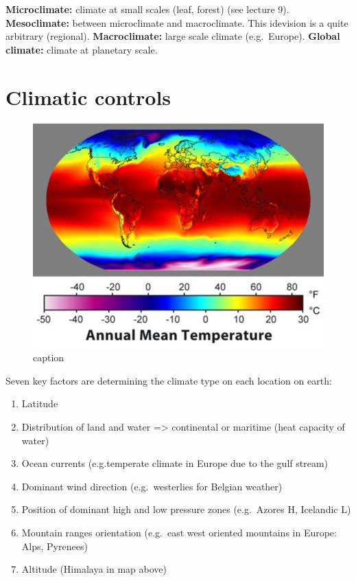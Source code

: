 \documentclass[12pt,oneside]{book}
\providecommand{\tightlist}{%
  \setlength{\itemsep}{0pt}\setlength{\parskip}{0pt}}
\begin{document}
\textbf{Microclimate:} climate at small scales (leaf, forest) (see
lecture 9). \textbf{Mesoclimate:} between microclimate and macroclimate.
This idevision is a quite arbitrary (regional). \textbf{Macroclimate:}
large scale climate (e.g.~Europe). \textbf{Global climate:} climate at
planetary scale.

\section{Climatic controls}\label{climatic-controls}

\begin{figure}

{\centering \includegraphics[width=0.8\linewidth]{figures/Figure81} 

}

\caption{caption}\label{fig:Climaticcontrols}
\end{figure}

Seven key factors are determining the climate type on each location on
earth:

\begin{enumerate}
\def\labelenumi{\arabic{enumi}.}
\tightlist
\item
  Latitude
\item
  Distribution of land and water =\textgreater{} continental or maritime
  (heat capacity of water)
\item
  Ocean currents (e.g.temperate climate in Europe due to the gulf
  stream)\\
\item
  Dominant wind direction (e.g.~westerlies for Belgian weather)
\item
  Position of dominant high and low pressure zones (e.g.~Azores H,
  Icelandic L)
\item
  Mountain ranges orientation (e.g.~east west oriented mountains in
  Europe: Alps, Pyrenees)
\item
  Altitude (Himalaya in map above)
\end{enumerate}
\end{document}
